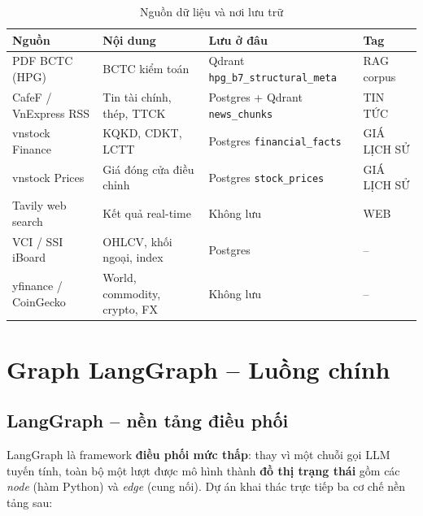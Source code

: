 \documentclass[12pt, a4paper]{report}
\begin{document}
\begin{table}[H]
\centering
\caption{Nguồn dữ liệu và nơi lưu trữ}
\small
\begin{tabularx}{\textwidth}{lXXl}
\toprule
\textbf{Nguồn} & \textbf{Nội dung} & \textbf{Lưu ở đâu} & \textbf{Tag} \\
\midrule
PDF BCTC (HPG) & BCTC kiểm toán & Qdrant \texttt{hpg\_b7\_structural\_meta} & RAG corpus \\
\rowcolor{rowgray}
CafeF / VnExpress RSS & Tin tài chính, thép, TTCK & Postgres + Qdrant \texttt{news\_chunks} & TIN TỨC \\
vnstock Finance & KQKD, CDKT, LCTT & Postgres \texttt{financial\_facts} & GIÁ LỊCH SỬ \\
\rowcolor{rowgray}
vnstock Prices & Giá đóng cửa điều chỉnh & Postgres \texttt{stock\_prices} & GIÁ LỊCH SỬ \\
Tavily web search & Kết quả real-time & Không lưu & WEB \\
\rowcolor{rowgray}
VCI / SSI iBoard & OHLCV, khối ngoại, index & Postgres & -- \\
yfinance / CoinGecko & World, commodity, crypto, FX & Không lưu & -- \\
\bottomrule
\end{tabularx}
\end{table}

\newpage

\chapter{Graph LangGraph -- Luồng chính}

\section{LangGraph -- nền tảng điều phối}

LangGraph là framework \textbf{điều phối mức thấp}: thay vì một chuỗi gọi LLM tuyến tính, toàn bộ một lượt được mô hình thành \textbf{đồ thị trạng thái} gồm các \emph{node} (hàm Python) và \emph{edge} (cung nối). Dự án khai thác trực tiếp ba cơ chế nền tảng sau:
\end{document}
